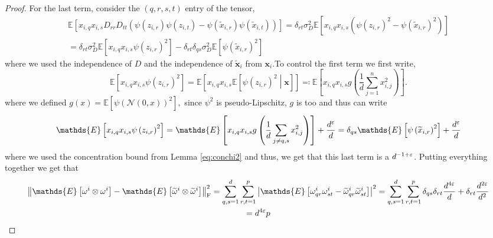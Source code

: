 \documentclass[letterpaper, 10pt, dvipsnames]{article}
\numberwithin{equation}{section}
\newcommand{\x}{\mathbf{x}}
\newcommand{\wt}{\widetilde}
\let\O\relax
\newcommand{\O}[1]{\mathcal{O}\left(#1\right)}
\newcommand{\E}{\mathds{E}}
\theoremstyle{definition}
\begin{document}
\begin{proof}
    For the last term, consider the $(q,r,s,t)$ entry of the tensor, 
    \begin{multline*}
      \E\left[x_{i,q}x_{i,s}D_{rr}D_{tt}\left(\psi\left(z_{i,r}\right)\psi(z_{i,t})-\psi\left(\wt{x}_{i,r}\right)\psi(\wt{x}_{i,t})\right)\right]
      =
      \delta_{rt} \sigma_D^2 \E\left[x_{i,q}x_{i,s}\left(\psi\left(z_{i,r}\right)^2-\psi\left(\wt{x}_{i,r}\right)^2\right)\right]\\
      =
      \delta_{rt}\sigma_D^2 \E\left[x_{i,q}x_{i,s}\psi\left(z_{i,r}\right)^2\right] - \delta_{rt}\delta_{qs}\sigma_D^2 \E\left[\psi\left(\wt{x}_{i,r}\right)^2\right]
    \end{multline*}
    where we used the independence of $D$ and the independence of $\wt{\x}_i$ from $\x_i$.To control the first term we first write,
    \[
    \E\left[x_{i,q}x_{i,s}\psi\left(z_{i,r}\right)^2\right] 
    =
    \E\left[
      x_{i,q}x_{i,s}\E\left[
        \psi\left(
          z_{i,r}
        \right)^2
        \middle\vert
        \x
      \right]
    \right]
    \eqqcolon
    \E\left[
      x_{i,q}x_{i,s}
      g\left(
        \frac{1}{d}\sum_{j=1}^n x_{i,j}^2
      \right)
    \right].
    \]
    where we defined $g(x)=\E\left[\psi(\mathcal{N}(0,x))^2\right],$ since $\psi^2$ is pseudo-Lipschitz, $g$ is too and thus can write 
    \[
    \E\left[x_{i,q}x_{i,s}\psi\left(z_{i,r}\right)^2\right] 
    =
    \E\left[
      x_{i,q}x_{i,s}g\left(
        \frac{1}{d}\sum_{j\neq q,s}x_{i,j}^2
      \right)
    \right]
    +
    \O{\frac{d^\varepsilon}{d}}
    =
    \delta_{qs}\E\left[{\psi}\left(\wt{x}_{i,r}\right)^2\right]+\O{\frac{d^\varepsilon}{d}} 
    \]
    where we used the concentration bound from Lemma \eqref{eq:conchi2} and thus, we get that this last term is a $\O{d^{-1+\varepsilon}}$. Putting everything together we get that 
    \begin{multline*}
      \left\Vert
        \E\left[\omega^i\otimes \omega^i\right]-\E\left[\wt{\omega}^i\otimes \wt{\omega}^i\right]
      \right\Vert_{\mathrm{F}}^2
      =
      \sum_{q,s=1}^d\sum_{r,t=1}^p 
      \left\vert
        \E\left[
        \omega^i_{qr}\omega^i_{st}-\wt{\omega}^i_{qr}\wt{\omega}^i_{st}
        \right]
      \right\vert^2  
      =
      \O{
      \sum_{q,s=1}^d
      \sum_{r,t=1}^p
      \delta_{qs}\delta_{rt}\frac{d^{4\varepsilon}}{d} 
      +
      \delta_{rt}\frac{d^{2\varepsilon}}{d^2}
      }
      \\
      =
      \O{d^{4\varepsilon}p}
    \end{multline*}
  \end{proof}
\end{document}
